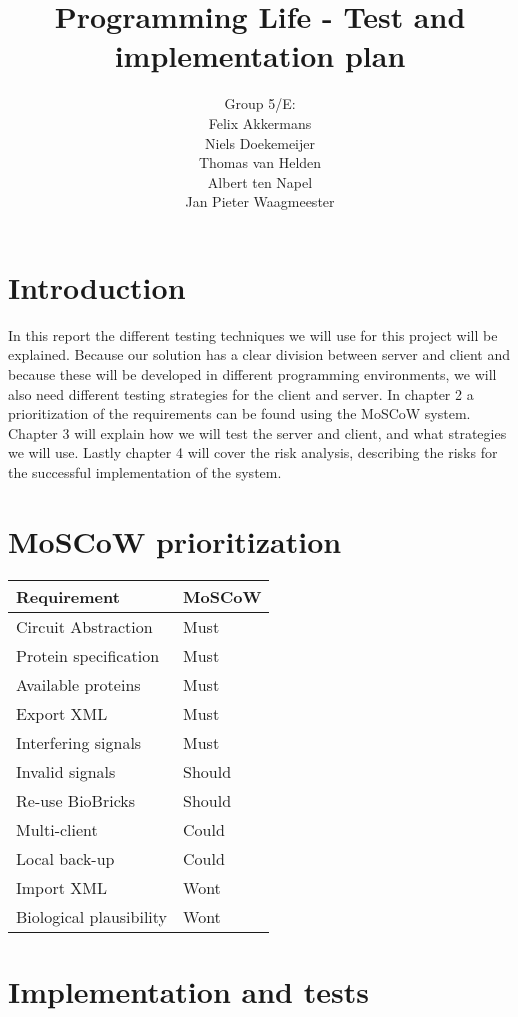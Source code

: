 \documentclass[a4paper]{article}
\title{Programming Life - Test and implementation plan }
\author{Group 5/E:\\
Felix Akkermans \\
Niels Doekemeijer \\
Thomas van Helden \\
Albert ten Napel \\
Jan Pieter Waagmeester}
\begin{document}
\maketitle

\vfill

\small{\tableofcontents}
\pagebreak

\section{Introduction}
In this report the different testing techniques we will use for this project will be explained. Because our solution has a clear division between server and client and because these will be developed in different programming environments, we will also need different testing strategies for the client and server. In chapter 2 a prioritization of the requirements can be found using the MoSCoW system. Chapter 3 will explain how we will test the server and client, and what strategies we will use. Lastly chapter 4 will cover the risk analysis, describing the risks for the successful implementation of the system.

\section{MoSCoW prioritization}
\begin{tabular}{ll}
Requirement & MoSCoW\\[2mm] \hline
Circuit Abstraction & Must \\
Protein specification & Must \\
Available proteins & Must \\
Export XML & Must \\
Interfering signals & Must \\
Invalid signals & Should \\
Re-use BioBricks & Should \\
Multi-client & Could \\
Local back-up & Could \\
Import XML & Wont \\
Biological plausibility & Wont \\

\end{tabular}

\section{Implementation and tests}
\end{document}
